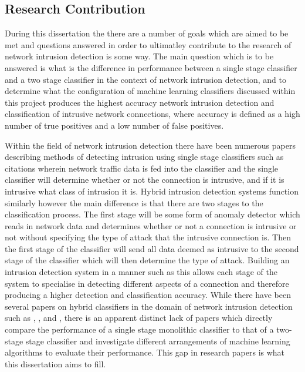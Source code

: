 	\subsection{Research Contribution} \label{Research Contribution}
	
During this dissertation the there are a number of goals which are aimed to be met and questions answered in order to ultimatley contribute to the research of network intrusion detection is some way. The main question which is to be answered is what is the difference in performance between a single stage classifier and a two stage classifier in the context of network intrusion detection, and to determine what the configuration of machine learning classifiers discussed within this project produces the highest accuracy network intrusion detection and classification of intrusive network connections, where accuracy is defined as a high number of true positives and a low number of false positives.
	
	Within the field of network intrusion detection there have been numerous papers describing methods of detecting intrusion using single stage classifiers such as {citations} wherein network traffic data is fed into the classifier and the single classifier will determine whether or not the connection is intrusive, and if it is intrusive what class of intrusion it is. Hybrid intrusion detection systems function similarly however the main difference is that there are two stages to the classification process. The first stage will be some form of anomaly detector which reads in network data and determines whether or not a connection is intrusive or not without specifying the type of attack that the intrusive connection is. Then the first stage of the classifier will send all data deemed as intrusive to the second stage of the classifier which will then determine the type of attack. Building an intrusion detection system in a manner such as this allows each stage of the system to specialise in detecting different aspects of a connection and therefore producing a higher detection and classification accuracy. While there have been several papers on hybrid classifiers in the domain of network intrusion detection such as \cite{powers2008hybrid}, \cite{panda2012hybrid}, and \cite{zhang2006hybrid}, there is an apparent distinct lack of papers which directly compare the performance of a single stage monolithic classifier to that of a two-stage stage classifier and investigate different arrangements of machine learning algorithms to evaluate their performance. This gap in research papers is what this dissertation aims to fill.
	
